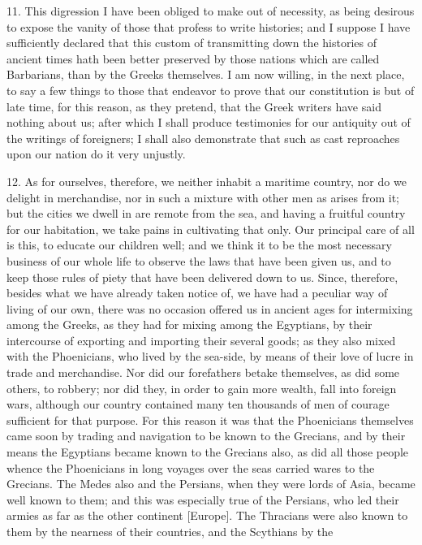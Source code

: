 11. This digression I have been obliged to make out of necessity, as being
desirous to expose the vanity of those that profess to write histories;
and I suppose I have sufficiently declared that this custom of
transmitting down the histories of ancient times hath been better
preserved by those nations which are called Barbarians, than by the Greeks
themselves. I am now willing, in the next place, to say a few things to
those that endeavor to prove that our constitution is but of late time,
for this reason, as they pretend, that the Greek writers have said nothing
about us; after which I shall produce testimonies for our antiquity out of
the writings of foreigners; I shall also demonstrate that such as cast
reproaches upon our nation do it very unjustly.

12. As for ourselves, therefore, we neither inhabit a maritime country,
nor do we delight in merchandise, nor in such a mixture with other men as
arises from it; but the cities we dwell in are remote from the sea, and
having a fruitful country for our habitation, we take pains in cultivating
that only. Our principal care of all is this, to educate our children
well; and we think it to be the most necessary business of our whole life
to observe the laws that have been given us, and to keep those rules of
piety that have been delivered down to us. Since, therefore, besides what
we have already taken notice of, we have had a peculiar way of living of
our own, there was no occasion offered us in ancient ages for intermixing
among the Greeks, as they had for mixing among the Egyptians, by their
intercourse of exporting and importing their several goods; as they also
mixed with the Phoenicians, who lived by the sea-side, by means of their
love of lucre in trade and merchandise. Nor did our forefathers betake
themselves, as did some others, to robbery; nor did they, in order to gain
more wealth, fall into foreign wars, although our country contained many
ten thousands of men of courage sufficient for that purpose. For this
reason it was that the Phoenicians themselves came soon by trading and
navigation to be known to the Grecians, and by their means the Egyptians
became known to the Grecians also, as did all those people whence the
Phoenicians in long voyages over the seas carried wares to the Grecians.
The Medes also and the Persians, when they were lords of Asia, became well
known to them; and this was especially true of the Persians, who led their
armies as far as the other continent [Europe]. The Thracians were also
known to them by the nearness of their countries, and the Scythians by the
